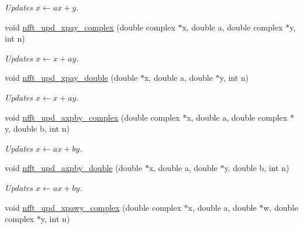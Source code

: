 \begin{CompactItemize}
\begin{CompactList}\small\item\em Updates $x \leftarrow a x + y$. \item\end{CompactList}\item 
\hypertarget{group__nfftutil_ga28}{
void \hyperlink{group__nfftutil_ga28}{nfft\_\-upd\_\-xpay\_\-complex} (double complex $\ast$x, double a, double complex $\ast$y, int n)}
\label{group__nfftutil_ga28}

\begin{CompactList}\small\item\em Updates $x \leftarrow x + a y$. \item\end{CompactList}\item 
\hypertarget{group__nfftutil_ga29}{
void \hyperlink{group__nfftutil_ga29}{nfft\_\-upd\_\-xpay\_\-double} (double $\ast$x, double a, double $\ast$y, int n)}
\label{group__nfftutil_ga29}

\begin{CompactList}\small\item\em Updates $x \leftarrow x + a y$. \item\end{CompactList}\item 
\hypertarget{group__nfftutil_ga30}{
void \hyperlink{group__nfftutil_ga30}{nfft\_\-upd\_\-axpby\_\-complex} (double complex $\ast$x, double a, double complex $\ast$y, double b, int n)}
\label{group__nfftutil_ga30}

\begin{CompactList}\small\item\em Updates $x \leftarrow a x + b y$. \item\end{CompactList}\item 
\hypertarget{group__nfftutil_ga31}{
void \hyperlink{group__nfftutil_ga31}{nfft\_\-upd\_\-axpby\_\-double} (double $\ast$x, double a, double $\ast$y, double b, int n)}
\label{group__nfftutil_ga31}

\begin{CompactList}\small\item\em Updates $x \leftarrow a x + b y$. \item\end{CompactList}\item 
\hypertarget{group__nfftutil_ga32}{
void \hyperlink{group__nfftutil_ga32}{nfft\_\-upd\_\-xpawy\_\-complex} (double complex $\ast$x, double a, double $\ast$w, double complex $\ast$y, int n)}
\label{group__nfftutil_ga32}


\end{CompactItemize}
